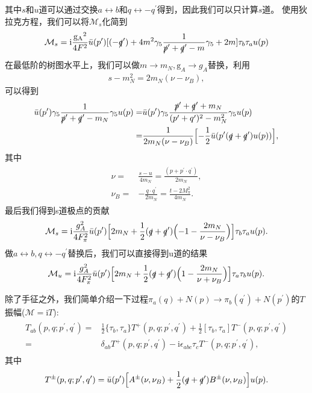 \documentclass[aps,tightenlines,16pt]{ctexart}
\numberwithin{equation}{section}
\begin{document}
其中$s$和$u$道可以通过交换$a\leftrightarrow b$和$q\leftrightarrow -q^{\prime}$得到，因此我们可以只计算$s$道。
使用狄拉克方程，我们可以将$\mathcal{M}_s$化简到
\begin{align}
   \mathcal{M}_s = \mbox{i}\frac{\mathrm{g_A}^2}{4F^2}\bar{u}(p^{\prime})[(-\slashed{q}^{\prime})+4m^2\gamma_5\frac{1}{\slashed{p}^{\prime}+\slashed{q}^{\prime}-m}\gamma_5+2m]\tau_b\tau_a u(p)
\end{align}
在最低阶的树图水平上，我们可以做$m\to m_N,\mathrm{g}_A\to g_A$替换，利用
\begin{align}
   s-m_N^2=2m_N(\nu-\nu_B),
\end{align}
可以得到
\begin{align}
   \begin{aligned}
      \bar{u}(p^{\prime})\gamma_5\frac{1}{\slashed{p}^{\prime}+\slashed{q}^{\prime}-m_N}\gamma_5u(p)=&\bar{u}(p^{\prime})\gamma_5\frac{\slashed{p}^{\prime}+\slashed{q}^{\prime}+m_N}{(p^{\prime}+q^{\prime})^2-m_N^2}\gamma_5 u(p)\\
      =&\frac{1}{2m_N(\nu-\nu_B)}\Bigl[-\frac{1}{2}\bar{u}(p^{\prime}(\slashed{q}+\slashed{q}^{\prime})u(p))\Bigr],
   \end{aligned}
\end{align}
其中
\begin{align}
   \begin{aligned}
      \nu=&\frac{s-u}{4m_N}=\frac{(p+p^{\prime}\cdot q^{\prime})}{2m_N},\\
      \nu_B=&-\frac{q\cdot q^{\prime}}{2m_N}=\frac{t-2M_{\pi}^2}{4m_N}.
   \end{aligned}
\end{align}
最后我们得到s道极点的贡献
\begin{align}
   \mathcal{M}_s=\mbox{i}\frac{g_A^2}{4F_{\pi}^2}\bar{u}(p^{\prime})\Bigl[2m_N+\frac{1}{2}(\slashed{q}+\slashed{q}^{\prime})\Bigl(-1-\frac{2m_N}{\nu-\nu_B}\Bigr)\Bigr]\tau_b \tau_a u(p).
\end{align}
做$a\leftrightarrow b,q\leftrightarrow -q^{\prime}$替换后，我们可以直接得到u道的结果
\begin{align}
   \mathcal{M}_u = \mbox{i}\frac{g_A^2}{4F_{\pi}^2}\bar{u}(p^{\prime})\Bigl[2m_N+\frac{1}{2}(\slashed{q}+\slashed{q}^{\prime})\Bigl(1-\frac{2m_N}{\nu+\nu_B}\Bigr)\Bigr]\tau_a \tau_b u(p).
\end{align}

除了手征之外，我们简单介绍一下过程$\pi_a(q)+N(p)\to \pi_b(q^{\prime})+N(p^{\prime})$的$T$振幅($\mathcal{M}=\mbox{i}T$):
\begin{align}
   \begin{aligned}
   T_{ab}(p,q;p^{\prime},q^{\prime})=&\frac{1}{2}\{\tau_b,\tau_a\}T^{+}(p,q;p^{\prime},q^{\prime})+\frac{1}{2}[\tau_b,\tau_a]T^-(p,q;p^{\prime},q^{\prime})\\
   =&\delta_{ab}T^+(p,q;p^{\prime},q^{\prime})-\mbox{i}\epsilon_{abc}\tau_cT^-(p,q;p^{\prime},q^{\prime}),
   \end{aligned}
\end{align}
其中
\begin{align}
   T^{\pm}(p,q;p^{\prime},q^{\prime})=\bar{u}(p^{\prime})\Bigl[A^{\pm}(\nu,\nu_B)+\frac{1}{2}(\slashed{q}+\slashed{q}^{\prime})B^{\pm}(\nu,\nu_B)\Bigr]u(p).
\end{align}
\end{document}
